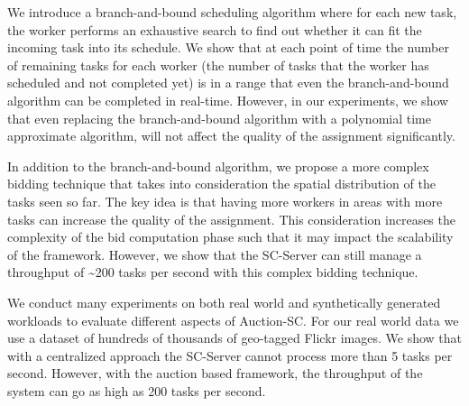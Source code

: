 We introduce a branch-and-bound scheduling algorithm where for each new task, the worker performs an exhaustive search to find out whether it can fit the incoming task into its schedule. We show that at each point of time the number of remaining tasks for each worker (the number of tasks that the worker has scheduled and not completed yet) is in a range that even the branch-and-bound algorithm can be completed in real-time. However, in our experiments, we show that even replacing the branch-and-bound algorithm with a polynomial time approximate algorithm, will not affect the quality of the assignment significantly.

In addition to the branch-and-bound algorithm, we propose a more complex bidding technique that takes into consideration the spatial distribution of the tasks seen so far. The key idea is that having more workers in areas with more tasks can increase the quality of the assignment. This consideration increases the complexity of the bid computation phase such that it may impact the scalability of the framework. However, we show that the SC-Server can still manage a throughput of \textasciitilde 200 tasks per second with this complex bidding technique.


We conduct many experiments on both real world and synthetically generated workloads to evaluate different aspects of Auction-SC. For our real world data we use a dataset of hundreds of thousands of geo-tagged Flickr images. We show that with a centralized approach the SC-Server cannot process more than 5 tasks per second. However, with the auction based framework, the throughput of the system can go as high as 200 tasks per second. 

